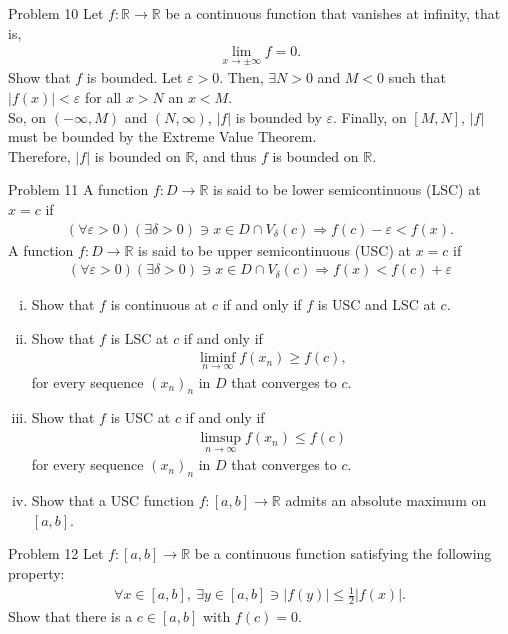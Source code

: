 \documentclass[10pt]{extarticle}
\newcommand{\R}{\mathbb{R}}
\begin{document}
  \begin{problem}{Problem 10}
    Let $f: \R\rightarrow \R$ be a continuous function that vanishes at infinity, that is,
    \begin{align*}
      \lim_{x\rightarrow \pm\infty}f = 0.
    \end{align*}
    Show that $f$ is bounded.
    \tcblower
    Let $\varepsilon > 0$. Then, $\exists N > 0$ and $M < 0$ such that $|f(x)| < \varepsilon$ for all $x > N$ an $x < M$.\\

    So, on $(-\infty,M)$ and $(N,\infty)$, $|f|$ is bounded by $\varepsilon$. Finally, on $[M,N]$, $|f|$ must be bounded by the Extreme Value Theorem.\\

    Therefore, $|f|$ is bounded on $\R$, and thus $f$ is bounded on $\R$.
  \end{problem}
  \begin{problem}{Problem 11}
    A function $f: D\rightarrow \R$ is said to be lower semicontinuous (LSC) at $x=c$ if
    \begin{align*}
      (\forall \varepsilon > 0)(\exists \delta > 0) \ni x\in D\cap V_{\delta}(c) \Rightarrow f(c) - \varepsilon < f(x).
    \end{align*}
    A function $f: D\rightarrow \R$ is said to be upper semicontinuous (USC) at $x=c$ if
    \begin{align*}
      (\forall \varepsilon > 0)(\exists \delta > 0) \ni x\in D\cap V_{\delta}(c) \Rightarrow f(x) < f(c) + \varepsilon
    \end{align*}
    \begin{enumerate}[(i)]
      \item Show that $f$ is continuous at $c$ if and only if $f$ is USC and LSC at $c$.
      \item Show that $f$ is LSC at $c$ if and only if
        \begin{align*}
          \liminf_{n\rightarrow\infty}f(x_n) \geq f(c),
        \end{align*}
        for every sequence $(x_n)_n$ in $D$ that converges to $c$.
      \item Show that $f$ is USC at $c$ if and only if
        \begin{align*}
          \limsup_{n\rightarrow\infty}f(x_n) \leq f(c)
        \end{align*}
        for every sequence $(x_n)_n$ in $D$ that converges to $c$.
      \item Show that a USC function $f: [a,b]\rightarrow \R$ admits an absolute maximum on $[a,b]$.
    \end{enumerate}
  \end{problem}
  \begin{problem}{Problem 12}
    Let $f: [a,b] \rightarrow \R$ be a continuous function satisfying the following property:
    \begin{align*}
      \forall x\in [a,b],~\exists y\in[a,b] \ni |f(y)| \leq \frac{1}{2}|f(x)|.
    \end{align*}
    Show that there is a $c\in [a,b]$ with $f(c) = 0$.
  \end{problem}
\end{document}
